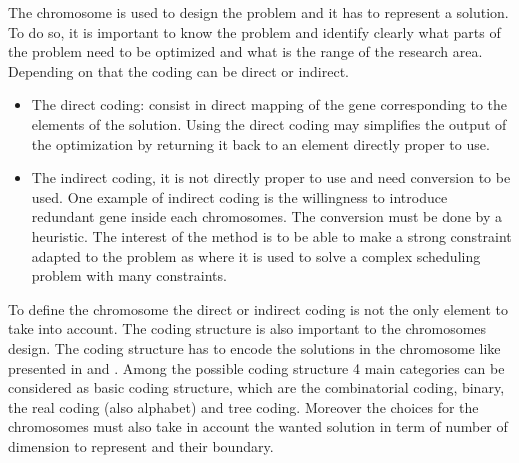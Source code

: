 The chromosome is used to design the problem and it has to represent a solution. To do so, it is important to know the problem and identify clearly what parts of the problem need to be optimized and what is the range of the research area. \\
Depending on that the coding can be direct or indirect.
\begin{itemize}
\item The direct coding: consist in direct mapping of the gene corresponding to the elements of the solution. Using the direct coding may simplifies the output of the optimization by returning it back to an element directly proper to use.
\item  The indirect coding, it is not directly proper to use and need conversion to be used. One example of indirect coding is the willingness to introduce redundant gene inside each chromosomes.  The conversion must be done by a heuristic. The interest of the method is to be able  to make a strong constraint adapted to the problem as \cite{121*ronald1997,131*walters1995} where it is used to solve a complex scheduling problem with many constraints. 
\end{itemize} 
To define the chromosome the direct or indirect coding is not the only element to take into account. The coding structure is also important to the chromosomes design. The coding structure has to encode the solutions in the chromosome like presented in \cite{131*walters1995} and \cite{123*owais2008}. Among the possible coding structure 4 main categories can be considered as basic coding structure, which are the combinatorial  coding, binary, the real coding (also alphabet) and tree coding. Moreover the choices for the chromosomes must also take in account the wanted solution in term of number of dimension to represent and their boundary.

